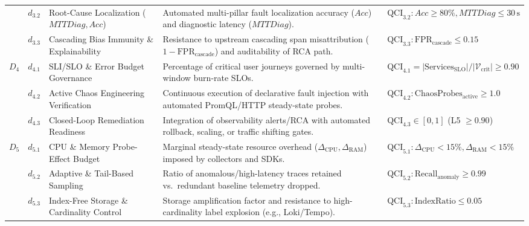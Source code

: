 \begin{table}[t]
\begin{tabularx}{\textwidth}{l l >{\raggedright\arraybackslash}p{4.3cm} >{\raggedright\arraybackslash}X l}
 & $d_{3.2}$ & Root-Cause Localization ($MTTDiag, Acc$) & Automated multi-pillar fault localization accuracy ($Acc$) and diagnostic latency ($MTTDiag$). & $\text{QCI}_{3.2}: Acc \ge 80\%, MTTDiag \le 30\,\text{s}$ \\
 & $d_{3.3}$ & Cascading Bias Immunity \& Explainability & Resistance to upstream cascading span misattribution ($1 - \text{FPR}_{\text{cascade}}$) and auditability of RCA path. & $\text{QCI}_{3.3}: \text{FPR}_{\text{cascade}} \le 0.15$ \\
\midrule
\multirow{3}{*}{\textbf{$D_4$}} & $d_{4.1}$ & SLI/SLO \& Error Budget Governance & Percentage of critical user journeys governed by multi-window burn-rate SLOs. & $\text{QCI}_{4.1} = |\text{Services}_{\text{SLO}}| / |\mathcal{V}_{\text{crit}}| \ge 0.90$ \\
 & $d_{4.2}$ & Active Chaos Engineering Verification & Continuous execution of declarative fault injection with automated PromQL/HTTP steady-state probes. & $\text{QCI}_{4.2}: \text{ChaosProbes}_{\text{active}} \ge 1.0$ \\
 & $d_{4.3}$ & Closed-Loop Remediation Readiness & Integration of observability alerts/RCA with automated rollback, scaling, or traffic shifting gates. & $\text{QCI}_{4.3} \in [0, 1]$ (L5 $\ge 0.90$) \\
\midrule
\multirow{3}{*}{\textbf{$D_5$}} & $d_{5.1}$ & CPU \& Memory Probe-Effect Budget & Marginal steady-state resource overhead ($\Delta_{\text{CPU}}, \Delta_{\text{RAM}}$) imposed by collectors and SDKs. & $\text{QCI}_{5.1}: \Delta_{\text{CPU}} < 15\%, \Delta_{\text{RAM}} < 15\%$ \\
 & $d_{5.2}$ & Adaptive \& Tail-Based Sampling & Ratio of anomalous/high-latency traces retained vs.\ redundant baseline telemetry dropped. & $\text{QCI}_{5.2}: \text{Recall}_{\text{anomaly}} \ge 0.99$ \\
 & $d_{5.3}$ & Index-Free Storage \& Cardinality Control & Storage amplification factor and resistance to high-cardinality label explosion (e.g., Loki/Tempo). & $\text{QCI}_{5.3}: \text{IndexRatio} \le 0.05$ \\
\bottomrule
\end{tabularx}
\end{table}
